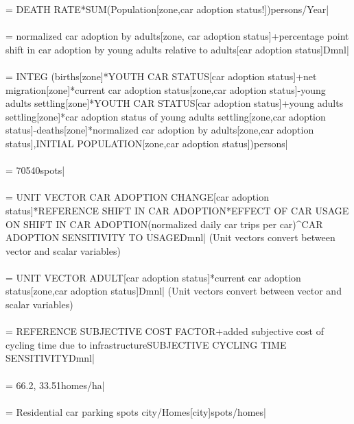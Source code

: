  = DEATH RATE*SUM(Population[zone,car adoption status!])persons/Year| \\ \\ 
 = normalized car adoption by adults[zone, car adoption status]+percentage point shift in car adoption by young adults relative to adults[car adoption status]Dmnl| \\ \\ 
 =  INTEG (births[zone]*YOUTH CAR STATUS[car adoption status]+net migration[zone]*current car adoption status[zone,car adoption status]-young adults settling[zone]*YOUTH CAR STATUS[car adoption status]+young adults settling[zone]*car adoption status of young adults settling[zone,car adoption status]-deaths[zone]*normalized car adoption by adults[zone,car adoption status],INITIAL POPULATION[zone,car adoption status])persons| \\ \\ 
 = 70540spots| \\ \\ 
 = UNIT VECTOR CAR ADOPTION CHANGE[car adoption status]*REFERENCE SHIFT IN CAR ADOPTION*EFFECT OF CAR USAGE ON SHIFT IN CAR ADOPTION(normalized daily car trips per car)\^{}CAR ADOPTION SENSITIVITY TO USAGEDmnl| (Unit vectors convert between vector and scalar variables) \\ \\ 
 = UNIT VECTOR ADULT[car adoption status]*current car adoption status[zone,car adoption status]Dmnl| (Unit vectors convert between vector and scalar variables) \\ \\ 
 = REFERENCE SUBJECTIVE COST FACTOR+added subjective cost of cycling time due to infrastructure\*SUBJECTIVE CYCLING TIME SENSITIVITYDmnl| \\ \\ 
 = 66.2, 33.51homes/ha| \\ \\ 
 = Residential car parking spots city/Homes[city]spots/homes| \\ \\ 
